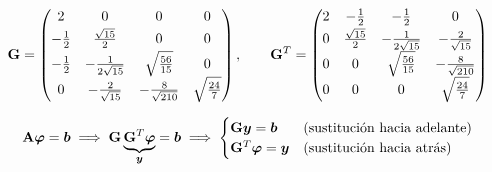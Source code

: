 \[
\mathbf{G} =
\begin{pmatrix}
	2 & 0 & 0 & 0\\[2pt]
	-\tfrac12 & \tfrac{\sqrt{15}}{2} & 0 & 0\\[2pt]
	-\tfrac12 & -\tfrac{1}{2\sqrt{15}} & \sqrt{\tfrac{56}{15}} & 0\\[2pt]
	0 & -\tfrac{2}{\sqrt{15}} & -\tfrac{8}{\sqrt{210}} & \sqrt{\tfrac{24}{7}}
\end{pmatrix},
\qquad
\mathbf{G}^T =
\begin{pmatrix}
	2 & -\tfrac12 & -\tfrac12 & 0\\[2pt]
	0 & \tfrac{\sqrt{15}}{2} & -\tfrac{1}{2\sqrt{15}} & -\tfrac{2}{\sqrt{15}}\\[2pt]
	0 & 0 & \sqrt{\tfrac{56}{15}} & -\tfrac{8}{\sqrt{210}}\\[2pt]
	0 & 0 & 0 & \sqrt{\tfrac{24}{7}}
\end{pmatrix}
\]



\[
\mathbf{A}\bm{\varphi} = \bm{b}
\;\Longrightarrow\;
\mathbf{G}\underbrace{\mathbf{G}^T\bm{\varphi}}_{\bm{y}} = \bm{b}
\;\Longrightarrow\;
\begin{cases}
	\mathbf{G}\bm{y} = \bm{b} & \text{(sustitución hacia adelante)}\\
	\mathbf{G}^T\bm{\varphi} = \bm{y} & \text{(sustitución hacia atrás)}
\end{cases}
\]

